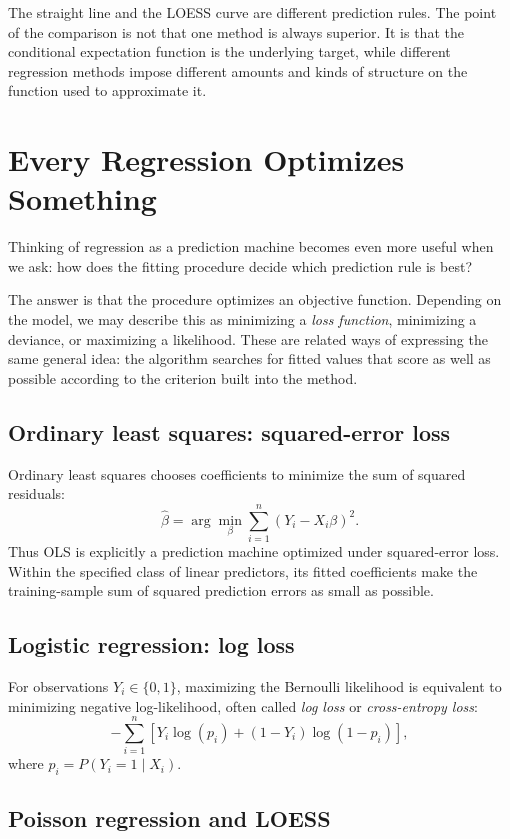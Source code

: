\documentclass[11pt]{report}
\begin{document}
The straight line and the LOESS curve are different prediction rules. The point of the comparison is not that one method is always superior. It is that the conditional expectation function is the underlying target, while different regression methods impose different amounts and kinds of structure on the function used to approximate it.

\section{Every Regression Optimizes Something}

Thinking of regression as a prediction machine becomes even more useful when we ask: how does the fitting procedure decide which prediction rule is best?

The answer is that the procedure optimizes an objective function. Depending on the model, we may describe this as minimizing a \emph{loss function}, minimizing a deviance, or maximizing a likelihood. These are related ways of expressing the same general idea: the algorithm searches for fitted values that score as well as possible according to the criterion built into the method.

\subsection{Ordinary least squares: squared-error loss}

Ordinary least squares chooses coefficients to minimize the sum of squared residuals:
\[
\widehat{\beta}
=
\arg\min_{\beta}
\sum_{i=1}^{n}
\left(Y_i-X_i\beta\right)^2.
\]
Thus OLS is explicitly a prediction machine optimized under squared-error loss. Within the specified class of linear predictors, its fitted coefficients make the training-sample sum of squared prediction errors as small as possible.

\subsection{Logistic regression: log loss}

For observations \(Y_i\in\{0,1\}\), maximizing the Bernoulli likelihood is equivalent to minimizing negative log-likelihood, often called \emph{log loss} or \emph{cross-entropy loss}:
\[
-\sum_{i=1}^{n}
\left[
Y_i\log(p_i)+(1-Y_i)\log(1-p_i)
\right],
\]
where \(p_i=P(Y_i=1\mid X_i)\).

\subsection{Poisson regression and LOESS}
\end{document}
